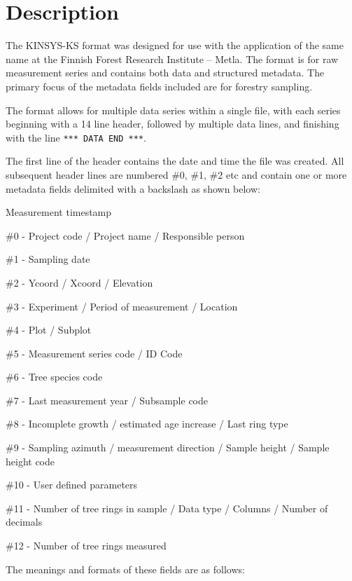 \section{Description}
The KINSYS-KS format was designed for use with the application of the same name at the Finnish Forest Research Institute -- Metla.  The format is for raw measurement series and contains both data and structured metadata.  The primary focus of the metadata fields included are for forestry sampling.

The format allows for multiple data series within a single file, with each series beginning with a 14 line header, followed by multiple data lines, and finishing with the line \verb|*** DATA END ***|.  

The first line of the header contains the date and time the file was created.  All subsequent header lines are numbered \#0, \#1, \#2 etc and contain one or more metadata fields delimited with a backslash as shown below:

\begin{itemize*}
 \item Measurement timestamp
 \item \#0 - Project code / Project name / Responsible person
 \item \#1 - Sampling date
 \item \#2 - Ycoord / Xcoord / Elevation 
 \item \#3 - Experiment / Period of measurement / Location
 \item \#4 - Plot / Subplot
 \item \#5 - Measurement series code / ID Code
 \item \#6 - Tree species code
 \item \#7 - Last measurement year / Subsample code
 \item \#8 - Incomplete growth / estimated age increase / Last ring type
 \item \#9 - Sampling azimuth / measurement direction / Sample height / Sample height code
 \item \#10 - User defined parameters
 \item \#11 - Number of tree rings in sample / Data type / Columns / Number of decimals
 \item \#12 - Number of tree rings measured
\end{itemize*}

The meanings and formats of these fields are as follows:

